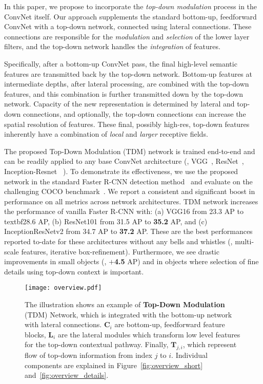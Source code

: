 \documentclass[10pt,twocolumn,letterpaper]{article}
\begin{document}
In this paper, we propose to incorporate the \emph{top-down modulation} process in the ConvNet itself. Our approach supplements the standard bottom-up, feedforward ConvNet with a top-down network, connected using lateral connections. These connections are responsible for the \emph{modulation} and \emph{selection} of the lower layer filters, and the top-down network handles the \emph{integration} of features.

Specifically, after a bottom-up ConvNet pass, the final high-level semantic features are transmitted back by the top-down network. Bottom-up features at intermediate depths, after lateral processing, are combined with 
the top-down features, and this combination is further transmitted down by the top-down network. Capacity of the new representation is determined by lateral and top-down connections, and optionally, the top-down connections can increase the spatial resolution of features. These final, possibly high-res, top-down features inherently have a combination of \emph{local} and \emph{larger} receptive fields. 

The proposed Top-Down Modulation (TDM) network is trained end-to-end and can be readily applied to any base ConvNet architecture (\eg, VGG~\cite{VGG}, ResNet~\cite{resnet}, Inception-Resnet~\cite{szegedy2016inception} \etc). To demonstrate its effectiveness, we use the proposed network in the standard Faster R-CNN detection method~\cite{ren2015faster} and evaluate on the challenging COCO benchmark~\cite{lin2014coco}. We report a consistent and significant boost in performance on all metrics across network architectures. 
TDM network increases the performance of vanilla Faster R-CNN with: (a) VGG16 from 23.3 AP to textbf{28.6} AP, (b) ResNet101 from 31.5 AP to \textbf{35.2} AP, and (c) InceptionResNetv2 from 34.7 AP to \textbf{37.2} AP. These are the best performances reported to-date for these architectures without any bells and whistles (\eg, multi-scale features, iterative box-refinement).
Furthermore, we see drastic improvements in small objects (\eg, $+$\textbf{4.5} AP) and in objects where selection of fine details using top-down context is important.

\begin{figure*}
    \centering
        \vspace{-0.1in}
    \texttt{[image: overview.pdf]}
            \vspace{-0.07in}
    \caption{The illustration shows an example of \textbf{Top-Down Modulation} (TDM) Network, which is integrated with the bottom-up network with lateral connections. $\mathbf{C}_i$ are bottom-up, feedforward feature blocks, $\mathbf{L}_i$ are the lateral modules which transform low level features for the top-down contextual pathway. Finally, $\mathbf{T}_{j,i}$, which represent flow of top-down information from index $j$ to $i$. Individual components are explained in Figure~\ref{fig:overview_short} and~\ref{fig:overview_details}.
    }
    \vspace{-0.2in}
    \label{fig:overview_long}
\end{figure*}
\end{document}
